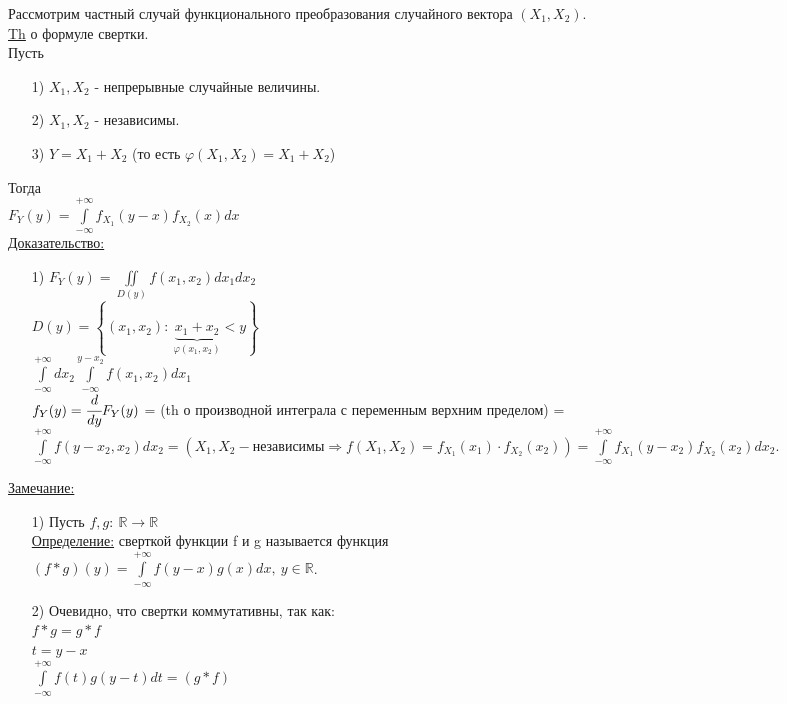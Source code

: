 
Рассмотрим частный случай функционального преобразования случайного вектора $(X_1, X_2)$. \\


\underline{Th} о формуле свертки. \\
Пусть 
\begin{enumerate}
	\item[1)] $X_1, X_2$ - непрерывные случайные величины.
	\item[2)] $X_1, X_2$ - независимы. 
	\item[3)] $Y = X_1 + X_2$ (то есть $\varphi(X_1, X_2) = X_1 + X_2$)
\end{enumerate}
Тогда \\
$\displaystyle  F_Y(y) = \int\limits_{-\infty}^{+\infty} f_{X_1} (y - x) f_{X_2} (x) dx$ \\

\underline{Доказательство:} \\
\begin{enumerate}
	\item[1)] $\displaystyle  F_Y(y) = \iint\limits_{D(y)} f(x_1, x_2) dx_1 dx_2$ \fbox{=} \\
	$D(y) = \left\{ (x_1, x_2): \ \underbrace{x_1 + x_2}_{\varphi(x_1, x_2)} < y\right\}$ \\
	\fbox{=} $\displaystyle  \int\limits_{-\infty}^{+\infty} dx_2 \int\limits_{-\infty}^{y - x_2} f(x_1, x_2) dx_1$ \\
	$f_Y(y) = \cfrac{d}{dy} F_Y(y)$ = (th о производной интеграла с переменным верхним пределом) = $\displaystyle  \int\limits_{-\infty}^{+\infty} f(y - x_2, x_2) dx_2 = \left( X_1, X_2 - \text{независимы} \Rightarrow f(X_1, X_2) = f_{X_1}(x_1) \cdot f_{X_2}(x_2) \right) = \int\limits_{-\infty}^{+\infty} f_{X_1} (y - x_2) f_{X_2} (x_2) dx_2$. \\
\end{enumerate}

\underline{Замечание:} 
\begin{enumerate}
	\item[1)] Пусть $f, g: \ \mathbb{R} \to \mathbb{R}$ \\
	\underline{Определение:} сверткой функции f и g называется функция \\
	$\displaystyle  (f * g)(y) = \int\limits_{-\infty}^{+\infty} f(y - x) g(x) dx, \ y \in \mathbb{R}$.
	\item[2)] Очевидно, что свертки коммутативны, так как: \\
	$f * g = g * f$ \\
	$t = y - x$ \\
	$\displaystyle  \int\limits_{-\infty}^{+\infty} f(t) g(y - t) dt = (g * f)$ \\
\end{enumerate}






















